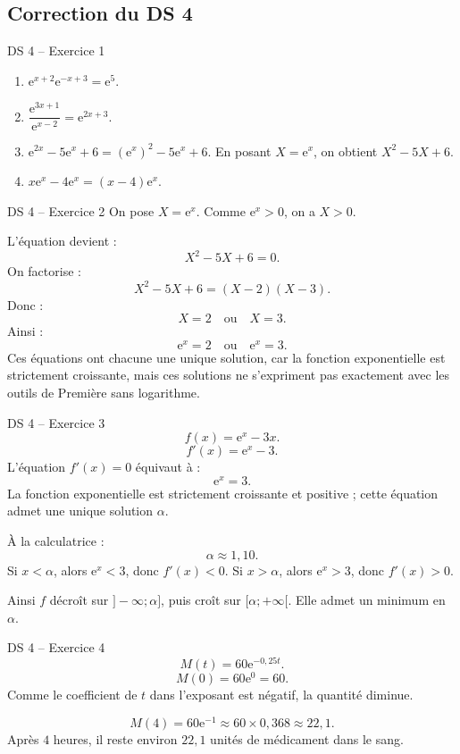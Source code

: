 \documentclass[11pt,a4paper]{article}
\newcommand{\e}{\mathrm{e}}
\begin{document}
\subsection{Correction du DS 4}

\begin{correctionbox}{DS 4 -- Exercice 1}
\begin{enumerate}
    \item $\e^{x+2}\e^{-x+3}=\e^5$.
    \item $\dfrac{\e^{3x+1}}{\e^{x-2}}=\e^{2x+3}$.
    \item $\e^{2x}-5\e^x+6=(\e^x)^2-5\e^x+6$. En posant $X=\e^x$, on obtient $X^2-5X+6$.
    \item $x\e^x-4\e^x=(x-4)\e^x$.
\end{enumerate}
\end{correctionbox}

\begin{correctionbox}{DS 4 -- Exercice 2}
On pose $X=\e^x$. Comme $\e^x>0$, on a $X>0$.

L'équation devient :
\[
X^2-5X+6=0.
\]
On factorise :
\[
X^2-5X+6=(X-2)(X-3).
\]
Donc :
\[
X=2
\quad \text{ou} \quad
X=3.
\]
Ainsi :
\[
\e^x=2
\quad \text{ou} \quad
\e^x=3.
\]
Ces équations ont chacune une unique solution, car la fonction exponentielle est strictement croissante, mais ces solutions ne s'expriment pas exactement avec les outils de Première sans logarithme.
\end{correctionbox}

\begin{correctionbox}{DS 4 -- Exercice 3}
\[
f(x)=\e^x-3x.
\]
\[
f'(x)=\e^x-3.
\]
L'équation $f'(x)=0$ équivaut à :
\[
\e^x=3.
\]
La fonction exponentielle est strictement croissante et positive ; cette équation admet une unique solution $\alpha$.

À la calculatrice :
\[
\alpha\approx 1,10.
\]
Si $x<\alpha$, alors $\e^x<3$, donc $f'(x)<0$.
Si $x>\alpha$, alors $\e^x>3$, donc $f'(x)>0$.

Ainsi $f$ décroît sur $]-\infty;\alpha]$, puis croît sur $[\alpha;+\infty[$. Elle admet un minimum en $\alpha$.
\end{correctionbox}

\begin{correctionbox}{DS 4 -- Exercice 4}
\[
M(t)=60\e^{-0,25t}.
\]
\[
M(0)=60\e^0=60.
\]
Comme le coefficient de $t$ dans l'exposant est négatif, la quantité diminue.

\[
M(4)=60\e^{-1}\approx 60\times0,368\approx22,1.
\]
Après $4$ heures, il reste environ $22,1$ unités de médicament dans le sang.
\end{correctionbox}
\end{document}
